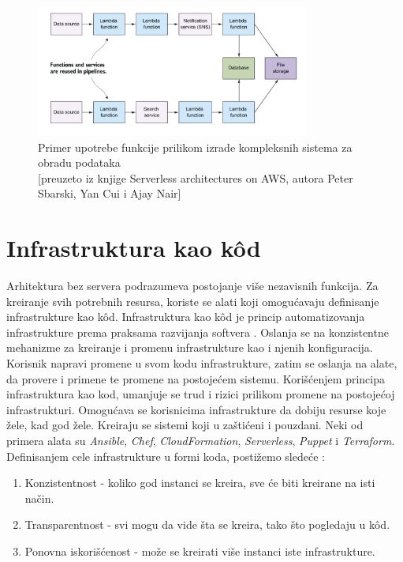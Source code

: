\documentclass[12pt,oneside]{memoir}
\begin{document}
\begin{figure}[!ht]
  \centering
  \includegraphics[width=0.8\textwidth]{Slika 16.png}
  \caption{Primer upotrebe funkcije prilikom izrade kompleksnih sistema za obradu podataka\\\footnotesize[preuzeto iz knjige Serverless architectures on AWS, autora Peter Sbarski, Yan Cui i Ajay Nair]}
  \label{fig:pipeline}
\end{figure}


\section{Infrastruktura kao kôd}
Arhitektura bez servera podrazumeva postojanje više nezavisnih funkcija. Za kreiranje svih potrebnih resursa, koriste se alati koji omogućavaju definisanje infrastrukture kao kôd. Infrastruktura kao kôd je princip automatizovanja infrastrukture prema praksama razvijanja softvera \cite{iac}. Oslanja se na konzistentne mehanizme za kreiranje i promenu infrastrukture kao i njenih konfiguracija. Korisnik napravi promene u svom kodu infrastrukture, zatim se oslanja na alate, da provere i primene te promene na postojećem sistemu. Korišćenjem principa infrastruktura kao kod, umanjuje se trud i rizici prilikom promene na postojećoj infrastrukturi. Omogućava se korisnicima infrastrukture da dobiju resurse koje žele, kad god žele. Kreiraju se sistemi koji u zaštićeni i pouzdani. Neki od primera alata su \emph{Ansible}, \emph{Chef}, \emph{CloudFormation}, \emph{Serverless}, \emph{Puppet} i \emph{Terraform}. Definisanjem cele infrastrukture u formi koda, postižemo sledeće \cite{iac}:
\begin{enumerate}
  \item Konzistentnost - koliko god instanci se kreira, sve će biti kreirane na isti način.
  \item Transparentnost - svi mogu da vide šta se kreira, tako što pogledaju u kôd.
  \item Ponovna iskorišćenost - može se kreirati više instanci iste infrastrukture.
\end{enumerate}
\end{document}
